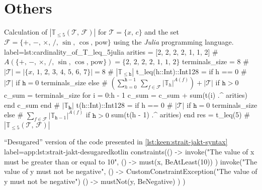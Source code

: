     \section{Others}
        \begin{code}{
            Calculation of \(|\mathbb{T}_{\leq 5}(\mathcal{T},\, \mathcal{F})|\) for 
            \(\mathcal{T} = \{x,\, c\}\) and the set \(\mathcal{F} = \{+,\, -,\, 
            \times,\, /,\, \sin,\, \cos,\, \mathrm{pow}\}\) using the \textit{Julia}
            programming language.
        }{label={lst:cardinality_of_T_leq_5}}{julia}
            arities = [2, 2, 2, 2, 1, 1, 2] # $A\left(\{+,\,-,\,\times,\,/,\,\sin,\,\cos,\,\mathrm{pow}\}\right) = \{2,\,2,\,2,\,2,\,1,\,1,\,2\}$
            terminals_size = 8  # $|\mathcal{T}| = |\{x,\,1,\,2,\,3,\,4,\,5,\,6,\,7\}| = 8$
            # $|\mathbb{T}_{\leq \mathtt{h}}|$
            t_leq(h::Int)::Int128 = if h == 0 # $|\mathcal{T}|$ if $\mathtt{h} = 0$
            terminals_size
            else  # $\left(\sum_{h = 0}^{\mathtt{h} - 1}\,\sum_{f \in \mathcal{F}} |\mathbb{T}_h|^{A(f)}\right)+ |\mathcal{T}|$ if $\mathtt{h} > 0$
            c_sum = terminals_size
            for i = 0:h - 1
                c_sum = c_sum + sum(t(i) .^ arities)
            end
            c_sum
            end
            # $|\mathbb{T}_\mathbf{h}|$
            t(h::Int)::Int128 = if h == 0 # $|\mathcal{T}|$ if $\mathtt{h} = 0$
            terminals_size
            else  # $\sum_{f \in \mathcal{F}} |\mathbb{T}_{\mathtt{h} - 1}|^{A(f)}$ if $\mathtt{h} > 0$
            sum(t(h - 1) .^ arities) 
            end
            res = t_leq(5)  # $|\mathbb{T}_{\leq 5}(\mathcal{T},\, \mathcal{F})|$
        \end{code}

        \begin{code}{
            \enquote{Desugared} version of the code presented in \vref{lst:keen:strait-jakt-syntax}
        }{label=app:lst:strait-jakt-desugared}{kotlin}
            constraints(() -> {
                invoke("The value of x must be greater than or equal to 10", () -> {
                    must(x, BeAtLeast(10))
                })
                invoke("The value of y must not be negative", 
                    () -> CustomConstraintException("The value of y must not be negative")
                () -> {
                    mustNot(y, BeNegative)
                })
            })
        \end{code}
        

